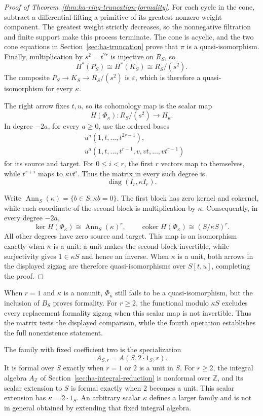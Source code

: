 \begin{proof}[Proof of Theorem~\ref{thm:ha-ring-truncation-formality}]
For each cycle in the cone, subtract a differential lifting a primitive
of its greatest nonzero weight component.
The greatest weight strictly decreases, so the nonnegative filtration
and finite support make this process terminate.
The cone is acyclic, and the two cone equations in
Section~\ref{sec:ha-truncation} prove that $\pi$ is a quasi-isomorphism.
Finally, multiplication by $s^2=t^{2r}$ is injective on $R_S$, so
\[
 H^*(P_S)\cong H^*(K_S)\cong R_S/(s^2).
\]
The composite $P_S\to K_S\to R_S/(s^2)$ is $\varepsilon$,
which is therefore a quasi-isomorphism for every $\kappa$.

The right arrow fixes $t,u$, so its cohomology map is the scalar map
\[
 H(\Phi_\kappa):R_S/(s^2)\longrightarrow H_\kappa.
\]
In degree $-2a$, for every $a\geq0$, use the ordered bases
\[
 \begin{split}
 &u^a(1,t,\ldots,t^{2r-1}),\\
 &u^a(1,t,\ldots,t^{r-1},v,vt,\ldots,vt^{r-1})
 \end{split}
\]
for its source and target.
For $0\leq i<r$, the first $r$ vectors map to themselves,
while $t^{r+i}$ maps to $\kappa vt^i$.
Thus the matrix in every such degree is
\[
 \operatorname{diag}(I_r,\kappa I_r).
\]

Write $\operatorname{Ann}_S(\kappa)=\{b\in S:\kappa b=0\}$.
The first block has zero kernel and cokernel, while each coordinate
of the second block is multiplication by $\kappa$.
Consequently, in every degree $-2a$,
\[
 \ker H(\Phi_\kappa)\cong\operatorname{Ann}_S(\kappa)^r,
 \qquad
 \operatorname{coker}H(\Phi_\kappa)\cong(S/\kappa S)^r.
\]
All other degrees have zero source and target.
This map is an isomorphism exactly when $\kappa$ is a unit:
a unit makes the second block invertible, while surjectivity gives
$1\in\kappa S$ and hence an inverse.
When $\kappa$ is a unit, both arrows in the displayed zigzag are
therefore quasi-isomorphisms over $S[t,u]$, completing the proof.
\end{proof}

When $r=1$ and $\kappa$ is a nonunit, $\Phi_\kappa$ still fails
to be a quasi-isomorphism, but the inclusion of $B_S$ proves formality.
For $r\geq2$, the functional modulo $\kappa S$ excludes every
replacement formality zigzag when this scalar map is not invertible.
Thus the matrix tests the displayed comparison, while the fourth
operation establishes the full nonexistence statement.

The family with fixed coefficient two is the specialization
\[
 A_{S,r}=A(S,2\cdot1_S,r).
\]
It is formal over $S$ exactly when $r=1$ or $2$ is a unit in $S$.
For $r\geq2$, the integral algebra $A_{\mathbb Z}$ of
Section~\ref{sec:ha-integral-reduction} is nonformal over $\mathbb Z$,
and its scalar extension to $S$ is formal exactly when $2$ becomes a unit.
This scalar extension has $\kappa=2\cdot1_S$.
An arbitrary scalar $\kappa$ defines a larger family and is not
in general obtained by extending that fixed integral algebra.

